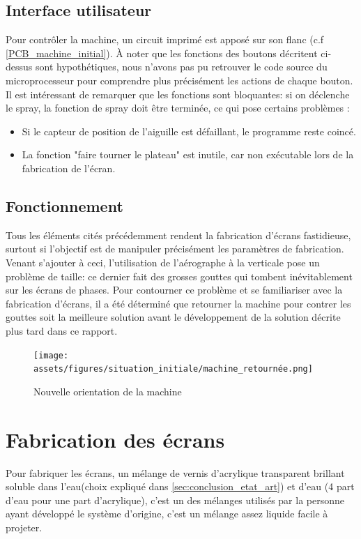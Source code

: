 \newpage
\subsection{Interface utilisateur}
Pour contrôler la machine, un circuit imprimé est apposé sur son flanc (c.f \autoref{PCB_machine_initial}).
À noter que les fonctions des boutons décritent ci-dessus sont hypothétiques, nous n'avons pas pu retrouver le code
source du microprocesseur pour comprendre plus précisément les actions de chaque bouton. Il est intéressant de remarquer
que les fonctions sont bloquantes: si on déclenche le spray, la fonction de spray doit être terminée, ce qui pose certains problèmes :

\begin{itemize}
    \item Si le capteur de position de l'aiguille est défaillant, le programme reste coincé.
    \item La fonction "faire tourner le plateau" est inutile, car non exécutable lors de la fabrication de l'écran.
\end{itemize}

\subsection{Fonctionnement}

Tous les éléments cités précédemment rendent la fabrication d'écrans fastidieuse, surtout si l'objectif est de manipuler précisément les paramètres de fabrication.
Venant s'ajouter à ceci, l'utilisation de l'aérographe à la verticale pose un problème de taille: ce dernier fait des grosses gouttes qui tombent inévitablement sur
les écrans de phases. Pour contourner ce problème et se familiariser avec la fabrication d'écrans, il a été déterminé que retourner la machine pour contrer les gouttes
soit la meilleure solution avant le développement de la solution décrite plus tard dans ce rapport.

\begin{figure}[H]
    \centering
    \texttt{[image: assets/figures/situation\_initiale/machine\_retournée.png]}
    \caption{Nouvelle orientation de la machine}
\end{figure}

\newpage
\section{Fabrication des écrans}\label{sec:fab_ecran_sit_init}
Pour fabriquer les écrans, un mélange de vernis d'acrylique transparent brillant soluble dans l'eau(choix expliqué dans \autoref{sec:conclusion_etat_art}) et d'eau (4 part d'eau pour une part d'acrylique),
c'est un des mélanges utilisés par la personne ayant développé le système d'origine, c'est un mélange assez liquide facile à projeter.

